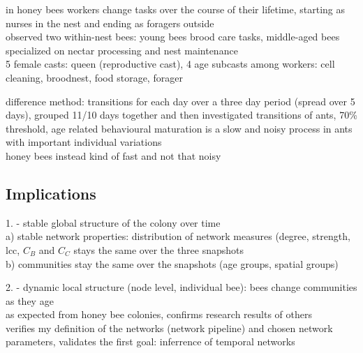 in honey bees workers change tasks over the course of their lifetime, starting as nurses in the nest and ending as foragers outside~\cite{seeley1982adaptive,johnson2008within}\\
\textcite{johnson2008within} observed two within-nest bees: young bees brood care tasks, middle-aged bees specialized on nectar processing and nest maintenance\\
\textcite{seeley1982adaptive} 5 female casts: queen (reproductive cast), 4 age subcasts among workers: cell cleaning, broodnest, food storage, forager

difference method: transitions for each day over a three day period (spread over 5 days), \textcite{mersch2013tracking} grouped 11/10 days together and then investigated transitions of ants, 70\% threshold, age related  behavioural maturation is a slow and noisy process in ants with important individual variations~\cite{mersch2013tracking}\\
honey bees instead kind of fast and not that noisy\\

\subsection{Implications}
1. - stable global structure of the colony over time\\
a) stable network properties: distribution of network measures (degree, strength, lcc, $C_B$ and $C_C$ stays the same over the three snapshots\\
b) communities stay the same over the snapshots (age groups, spatial groups)

2. - dynamic local structure (node level, individual bee): bees change communities as they age\\

as expected from honey bee colonies, confirms research results of others\\
verifies my definition of the networks (network pipeline) and chosen network parameters, validates the first goal: inferrence of temporal networks\\